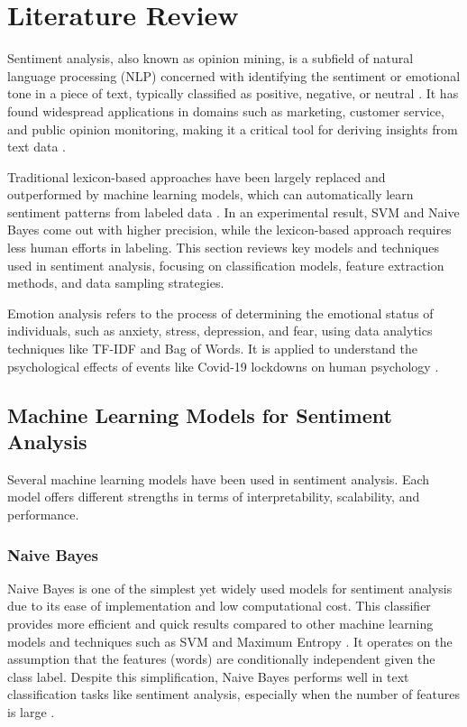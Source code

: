 

\section{Literature Review}

Sentiment analysis, also known as opinion mining, is a subfield of natural language processing (NLP) concerned with identifying the sentiment or emotional tone in a piece of text, typically classified as positive, negative, or neutral \cite{Saad2017}. It has found widespread applications in domains such as marketing, customer service, and public opinion monitoring, making it a critical tool for deriving insights from text data \cite{Rodriguez2023}.

Traditional lexicon-based approaches have been largely replaced and outperformed by machine learning models, which can automatically learn sentiment patterns from labeled data \cite{Mahmood2020}. In an experimental result, SVM and Naive Bayes come out with higher precision, while the lexicon-based approach requires less human efforts in labeling. This section reviews key models and techniques used in sentiment analysis, focusing on classification models, feature extraction methods, and data sampling strategies.

Emotion analysis refers to the process of determining the emotional status of individuals, such as anxiety, stress, depression, and fear, using data analytics techniques like TF-IDF and Bag of Words. It is applied to understand the psychological effects of events like Covid-19 lockdowns on human psychology \cite{Chatterjee2023}.

\subsection{Machine Learning Models for Sentiment Analysis}

Several machine learning models have been used in sentiment analysis. Each model offers different strengths in terms of interpretability, scalability, and performance.

\subsubsection{Naive Bayes}

Naive Bayes is one of the simplest yet widely used models for sentiment analysis due to its ease of implementation and low computational cost. This classifier provides more efficient and quick results compared to other machine learning models and techniques such as SVM and Maximum Entropy \cite{Mathapati2017}. It operates on the assumption that the features (words) are conditionally independent given the class label. Despite this simplification, Naive Bayes performs well in text classification tasks like sentiment analysis, especially when the number of features is large \cite{Saini2021}.

